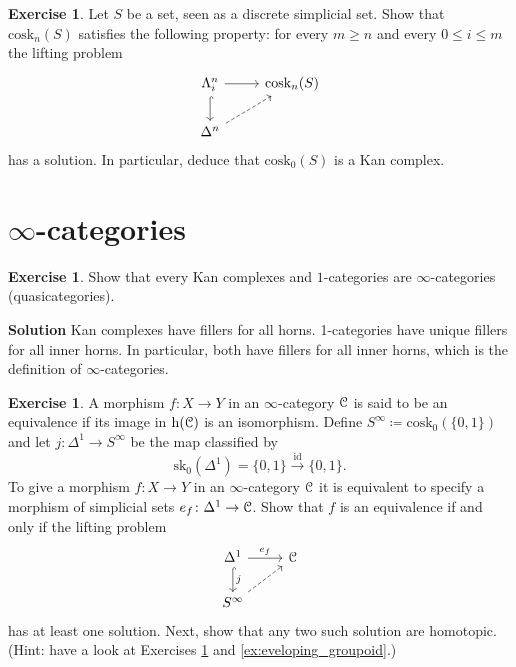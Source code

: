 \documentclass[10pt,a4paper,reqno,oneside]{book} %
\theoremstyle{plain}
\theoremstyle{definition}
\newtheorem{exercise}[thm]{Exercise}
\theoremstyle{remark}
\numberwithin{equation}{section}
\begin{document}
\begin{exercise} \label{ex:coskeleton_Kan_complex}
	Let $S$ be a set, seen as a discrete simplicial set.
	Show that $\mathrm{cosk}_n(S)$ satisfies the following property: for every $m \ge n$ and every $0 \le i \le m$ the lifting problem
	\[ \begin{tikzcd}
		\Lambda^n_i \arrow{r} \arrow[hook]{d} & \mathrm{cosk}_n(S) \\
		\Delta^n \arrow[dashed]{ur}
	\end{tikzcd} \]
	has a solution.
	In particular, deduce that $\mathrm{cosk}_0(S)$ is a Kan complex.
\end{exercise}

\section{$\infty$-categories}

\begin{exercise}
	Show that every Kan complexes and $1$-categories are $\infty$-categories (quasicategories).
\end{exercise}

\noindent
\textbf{Solution}
Kan complexes have fillers for all horns. 1-categories have unique fillers for all inner horns. In particular, both have
fillers for all inner horns, which is the definition of $\infty$-categories.

\begin{exercise} \label{ex:equivalences_S_infty}
	A morphism $f \colon X \to Y$ in an $\infty$-category $\mathcal C$ is said to be an equivalence if its image in $\mathrm h(\mathcal C)$ is an isomorphism.
	Define $S^\infty \coloneqq \mathrm{cosk}_0(\{0,1\})$ and let $j \colon \Delta^1 \to S^\infty$ be the map classified by
	\[ \mathrm{sk}_0(\Delta^1) = \{0,1\} \xrightarrow{\mathrm{id}} \{0,1\} . \]
	To give a morphism $f \colon X \to Y$ in an $\infty$-category $\mathcal C$ it is equivalent to specify a morphism of simplicial sets $e_f \colon \Delta^1 \to \mathcal C$.
	Show that $f$ is an equivalence if and only if the lifting problem
	\[ \begin{tikzcd}
		\Delta^1 \arrow[hook]{d}{j} \arrow{r}{e_f} & \cC \\
		S^\infty \arrow[dashed]{ur}
	\end{tikzcd} \]
	has at least one solution.
	Next, show that any two such solution are homotopic.
	(Hint: have a look at Exercises \ref{ex:coskeleton_Kan_complex} and \ref{ex:eveloping_groupoid}.)
\end{exercise}
\end{document}
